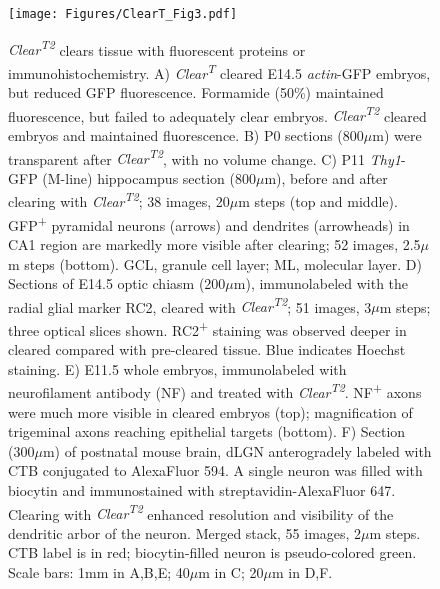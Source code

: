 \begin{figure}[hbtp]
    \begin{center}
        \texttt{[image: Figures/ClearT\_Fig3.pdf]}
        \caption[\emph{Clear\textsuperscript{T2}} clears tissue with fluorescent proteins or immunohistochemistry.]
        {\emph{Clear\textsuperscript{T2}} clears tissue with fluorescent proteins or immunohistochemistry.
        A) \emph{Clear\textsuperscript{T}} cleared E14.5 \emph{actin}-GFP embryos, but reduced GFP fluorescence.
        Formamide (50\%) maintained fluorescence, but failed to adequately clear embryos.
        \emph{Clear\textsuperscript{T2}} cleared embryos and maintained fluorescence.
        B) P0 sections (800$\mu$m) were transparent after \emph{Clear\textsuperscript{T2}}, with no volume change.
        C) P11 \emph{Thy1}-GFP (M-line) hippocampus section (800$\mu$m), before and after clearing with \emph{Clear\textsuperscript{T2}}; 38 images, 20$\mu$m steps (top and middle).
        GFP\textsuperscript{+} pyramidal neurons (arrows) and dendrites (arrowheads) in CA1 region are markedly more visible after clearing; 52 images, 2.5$\mu$m steps (bottom).
        GCL, granule cell layer; ML, molecular layer.
        D) Sections of E14.5 optic chiasm (200$\mu$m), immunolabeled with the radial glial marker RC2, cleared with \emph{Clear\textsuperscript{T2}}; 51 images, 3$\mu$m steps; three optical slices shown.
        RC2\textsuperscript{+} staining was observed deeper in cleared compared with pre-cleared tissue.
        Blue indicates Hoechst staining.
        E) E11.5 whole embryos, immunolabeled with neurofilament antibody (NF) and treated with \emph{Clear\textsuperscript{T2}}.
        NF\textsuperscript{+} axons were much more visible in cleared embryos (top); magnification of trigeminal axons reaching epithelial targets (bottom).
        F) Section (300$\mu$m) of postnatal mouse brain, dLGN anterogradely labeled with CTB conjugated to AlexaFluor 594.
        A single neuron was filled with biocytin and immunostained with streptavidin-AlexaFluor 647.
        Clearing with \emph{Clear\textsuperscript{T2}} enhanced resolution and visibility of the dendritic arbor of the neuron.
        Merged stack, 55 images, 2$\mu$m steps.
        CTB label is in red; biocytin-filled neuron is pseudo-colored green. Scale bars: 1mm in A,B,E; 40$\mu$m in C; 20$\mu$m in D,F.
        }
        \label{ClearT\_Fig3}
    \end{center}
\end{figure}

